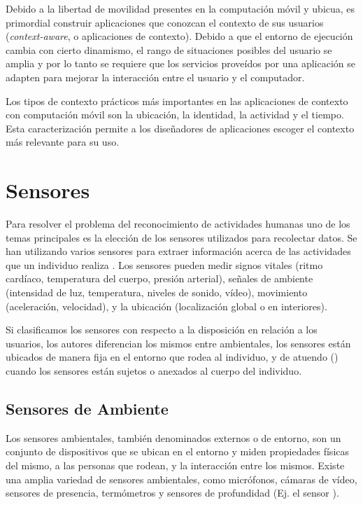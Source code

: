 Debido a la libertad de movilidad presentes en la computación móvil
y ubicua, es primordial construir aplicaciones que conozcan el contexto
de sus usuarios (\emph{context-aware}, o aplicaciones de contexto).
Debido a que el entorno de ejecución cambia con cierto dinamismo,
el rango de situaciones posibles del usuario se amplia y por lo tanto
se requiere que los servicios proveídos por una aplicación se adapten
para mejorar la interacción entre el usuario y el computador. 

Los tipos de contexto prácticos más importantes en las aplicaciones
de contexto con computación móvil son la ubicación, la identidad,
la actividad y el tiempo. Esta caracterización permite a los diseñadores
de aplicaciones escoger el contexto más relevante para su uso.

\section{Sensores}

\label{sec23:sensores} Para resolver el problema del reconocimiento
de actividades humanas uno de los temas principales es la elección
de los sensores utilizados para recolectar datos. Se han utilizando
varios sensores para extraer información acerca de las actividades
que un individuo realiza \cite{Chen2012,LaraLabrador2012}. Los sensores
pueden medir signos vitales (ritmo cardíaco, temperatura del cuerpo,
presión arterial), señales de ambiente (intensidad de luz, temperatura,
niveles de sonido, vídeo), movimiento (aceleración, velocidad), y
la ubicación (localización global o en interiores). 

Si clasificamos los sensores con respecto a la disposición en relación
a los usuarios, los autores \cite{ReyesOrtiz2015,LaraLabrador2013}
diferencian los mismos entre ambientales, los sensores están ubicados
de manera fija en el entorno que rodea al individuo, y de atuendo
(\emph{}) cuando los sensores están sujetos o anexados
al cuerpo del individuo.

\subsection{Sensores de Ambiente}

Los sensores ambientales, también denominados externos o de entorno,
son un conjunto de dispositivos que se ubican en el entorno y miden
propiedades físicas del mismo, a las personas que rodean, y la interacción
entre los mismos. Existe una amplia variedad de sensores ambientales,
como micrófonos, cámaras de vídeo, sensores de presencia, termómetros
y sensores de profundidad (Ej. el sensor ). 


